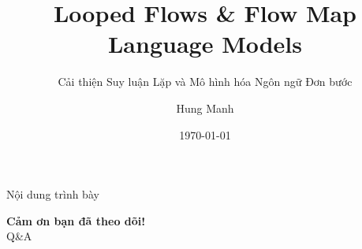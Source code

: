 \documentclass[aspectratio=169]{beamer}
\title[Looped Flows \& Flow Map LMs]{Looped Flows \& Flow Map Language Models}
\subtitle{Cải thiện Suy luận Lặp và Mô hình hóa Ngôn ngữ Đơn bước}
\author{Hung Manh}
\date{\today}
\begin{document}
\begin{frame}
    \titlepage
\end{frame}

\begin{frame}{Nội dung trình bày}
    \tableofcontents
\end{frame}







\begin{frame}
    \centering
    \Huge \textbf{Cảm ơn bạn đã theo dõi!}\\
    \vspace{0.5cm}
    \Large Q\&A
\end{frame}
\end{document}
